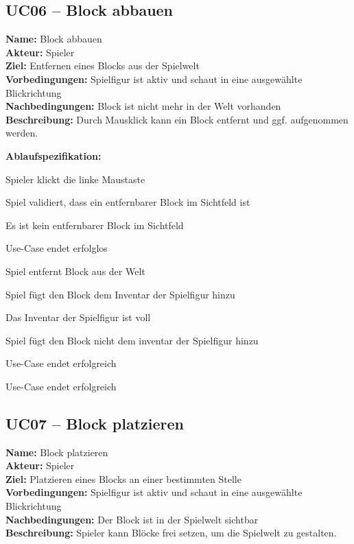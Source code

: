 \documentclass{article}
\begin{document}
\newpage

\subsection*{UC06 – Block abbauen}

\textbf{Name:} Block abbauen \\
\textbf{Akteur:} Spieler \\
\textbf{Ziel:} Entfernen eines Blocks aus der Spielwelt \\
\textbf{Vorbedingungen:} Spielfigur ist aktiv und schaut in eine ausgewählte Blickrichtung \\
\textbf{Nachbedingungen:} Block ist nicht mehr in der Welt vorhanden \\
\textbf{Beschreibung:} Durch Mausklick kann ein Block entfernt und ggf. aufgenommen werden.

\textbf{Ablaufspezifikation:}
\begin{description}[style=nextline,leftmargin=1.9cm,labelwidth=1.6cm]
  \item[1.] Spieler klickt die linke Maustaste
  \item[2.] Spiel validiert, dass ein entfernbarer Block im Sichtfeld ist
  \item[2a.] Es ist kein entfernbarer Block im Sichtfeld
  \item[2a.1.] Use-Case endet erfolglos
  \item[3.] Spiel entfernt Block aus der Welt
  \item[4.] Spiel fügt den Block dem Inventar der Spielfigur hinzu
  \item[4a.] Das Inventar der Spielfigur ist voll
  \item[4a.1.] Spiel fügt den Block nicht dem inventar der Spielfigur hinzu
  \item[4a.2.] Use-Case endet erfolgreich 
  \item[5.] Use-Case endet erfolgreich
\end{description}

\newpage

\subsection*{UC07 – Block platzieren}

\textbf{Name:} Block platzieren \\
\textbf{Akteur:} Spieler \\
\textbf{Ziel:} Platzieren eines Blocks an einer bestimmten Stelle \\
\textbf{Vorbedingungen:} Spielfigur ist aktiv und schaut in eine ausgewählte Blickrichtung \\
\textbf{Nachbedingungen:} Der Block ist in der Spielwelt sichtbar \\
\textbf{Beschreibung:} Spieler kann Blöcke frei setzen, um die Spielwelt zu gestalten.
\end{document}
